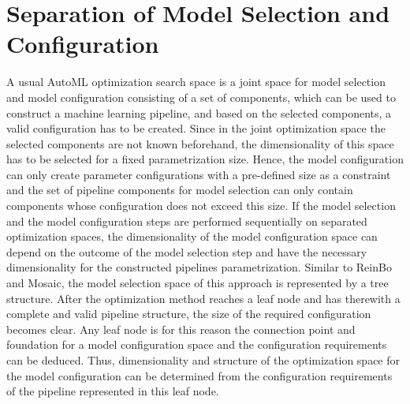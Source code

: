 \section{Separation of Model Selection and Configuration}
\label{sec:approach:separation}
A usual AutoML optimization search space is a joint space for model selection and model configuration consisting of a set of components, which can be used to construct a machine learning pipeline, and based on the selected components, a valid configuration has to be created.
Since in the joint optimization space the selected components are not known beforehand, the dimensionality of this space has to be selected for a fixed parametrization size.
Hence, the model configuration can only create parameter configurations with a pre-defined size as a constraint and the set of pipeline components for model selection can only contain components whose configuration does not exceed this size.\newline
If the model selection and the model configuration steps are performed sequentially on separated optimization spaces, the dimensionality of the model configuration space can depend on the outcome of the model selection step and have the necessary dimensionality for the constructed pipelines parametrization.\newline
Similar to ReinBo and Mosaic, the model selection space of this approach is represented by a tree structure.
After the optimization method reaches a leaf node and has therewith a complete and valid pipeline structure, the size of the required configuration becomes clear.
Any leaf node is for this reason the connection point and foundation for a model configuration space and the configuration requirements can be deduced.
Thus, dimensionality and structure of the optimization space for the model configuration can be determined from the configuration requirements of the pipeline represented in this leaf node.

